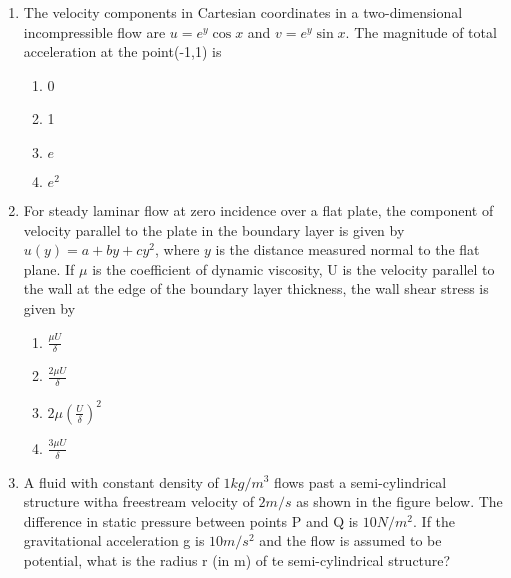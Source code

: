 \documentclass[journal]{IEEEtran}
\begin{document}
\begin{enumerate}
\item The velocity components in Cartesian coordinates in a two-dimensional incompressible flow are $u=e^y\cos{x}$ and $v=e^y\sin{x}$. The magnitude of total acceleration at the point(-1,1) is
\begin{multicols}{2}   
\begin{enumerate}
    \item 0
    \item 1
    \item $e$
    \item $e^2$
\end{enumerate}
\end{multicols}
\vspace{0.5cm}
\item For steady laminar flow at zero incidence over a flat plate, the component of velocity parallel to the plate in the boundary layer is given by $u(y)=a+by+cy^2$, where $y$ is the distance measured normal to the flat plane. If $\mu$ is the coefficient of dynamic viscosity, U is the velocity parallel to the wall at the edge of the boundary layer thickness, the wall shear stress is given by 
\begin{multicols}{2}
    \begin{enumerate}
        \item $\frac{\mu U}{\delta}$
        \item $\frac{2\mu U}{\delta}$
        \item $2\mu(\frac{U}{\delta})^2$
        \item $\frac{3\mu U}{\delta}$
    \end{enumerate}
\end{multicols}
\item A fluid with constant density of $1kg/m^3$ flows past a semi-cylindrical structure witha freestream velocity of $2m/s$ as shown in the figure below. The difference in static pressure between points P and Q is $10 N/m^2$. If the gravitational acceleration g is $10m/s^2$ and the flow is assumed to be potential, what is the radius r (in m) of te semi-cylindrical structure?
\begin{figure}[H]
\centering
{}%


\end{figure}
\end{enumerate}
\end{document}
